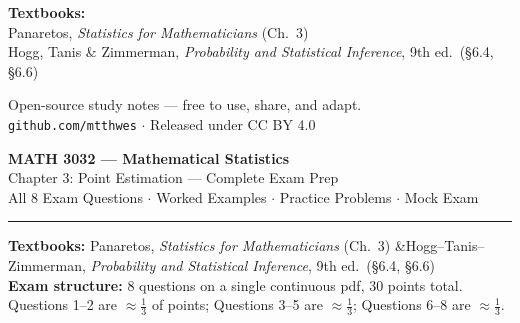 \documentclass[11pt,a4paper]{article}
\begin{document}
\begin{titlepage}
\begin{center}
    \vspace{2cm}

    \begin{tcolorbox}[infobox, width=0.72\textwidth]
      \small\textbf{Textbooks:} \\
      Panaretos, \textit{Statistics for Mathematicians} (Ch.\ 3)\\
      Hogg, Tanis \& Zimmerman, \textit{Probability and Statistical Inference}, 9th ed.\ (\S6.4, \S6.6)
    \end{tcolorbox}

    \vfill

    \begin{tcolorbox}[successbox, width=0.72\textwidth]
      \small\centering
      Open-source study notes --- free to use, share, and adapt.\\
      \texttt{github.com/mtthwes} \quad $\cdot$ \quad Released under CC BY 4.0
    \end{tcolorbox}

  \end{center}
\end{titlepage}

\begin{center}
  {\LARGE\bfseries MATH 3032 --- Mathematical Statistics}\\[6pt]
  {\large Chapter 3: Point Estimation --- Complete Exam Prep}\\[4pt]
  {\normalsize\color{sectionGray} All 8 Exam Questions $\cdot$ Worked Examples $\cdot$ Practice Problems $\cdot$ Mock Exam}\\[6pt]
  \rule{\linewidth}{0.8pt}
\end{center}

\vspace{4pt}

\begin{tcolorbox}[formulabox, title={}]
\textbf{Textbooks:} Panaretos, \textit{Statistics for Mathematicians} (Ch.\ 3) \quad\&\quad Hogg--Tanis--Zimmerman, \textit{Probability and Statistical Inference}, 9th ed.\ (§6.4, §6.6)\\[4pt]
\textbf{Exam structure:} 8 questions on a single continuous pdf, 30 points total. Questions 1--2 are $\approx\!\tfrac{1}{3}$ of points; Questions 3--5 are $\approx\!\tfrac{1}{3}$; Questions 6--8 are $\approx\!\tfrac{1}{3}$.
\end{tcolorbox}

\tableofcontents
\newpage

\end{document}
